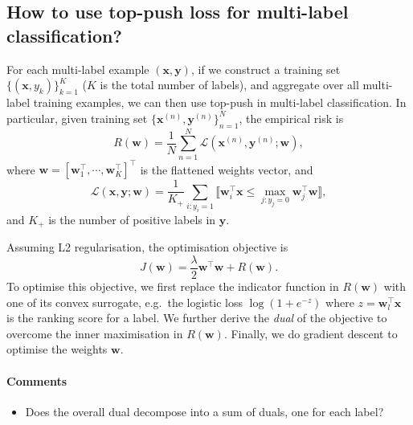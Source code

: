 \documentclass[9pt]{extarticle}
\newcommand{\eat}[1]{}
\newcommand{\llb}{\llbracket}
\newcommand{\rrb}{\rrbracket}
\newcommand{\x}{\mathbf{x}}
\newcommand{\y}{\mathbf{y}}
\newcommand{\1}{\mathbf{1}}
\newcommand{\w}{\mathbf{w}}
\newcommand{\LCal}{\mathcal{L}}
\newcommand{\pb}[1]{^{({#1})}}
\newcommand{\eg}{e.g.\ }
\begin{document}
\subsection*{How to use top-push loss for multi-label classification?}

For each multi-label example $(\x, \y)$, if we construct a training set $\{(\x, y_k)\}_{k=1}^K$ ($K$ is the total number of labels),
and aggregate over all multi-label training examples, we can then use top-push in multi-label classification. 
In particular, given training set $\{\x\pb{n}, \y\pb{n}\}_{n=1}^N$, the empirical risk is
\begin{equation*}
R(\w) = \frac{1}{N} \sum_{n=1}^N \LCal(\x\pb{n}, \y\pb{n}; \w),
\end{equation*}
where $\w = [\w_1^\top, \cdots, \w_K^\top]^\top$ is the flattened weights vector, and
\begin{equation}
\label{eq:top-push_loss}
\LCal(\x, \y; \w) = \frac{1}{K_+} \sum_{i:y_i=1} \llb \w_i^\top \x \le \underset{j:y_j=0}{\max} \w_j^\top \w \rrb,
\end{equation}
and $K_+$ is the number of positive labels in $\y$.

\eat{
\begin{equation*}
R(\w) = \frac{1}{N} \sum_{n=1}^N \frac{1}{K_+^n} \sum_{i:y_i^n=1} \llb \w_i^\top \x \le \underset{j:y_j^n=0}{\max} \w_j^\top \x \rrb,
\end{equation*}
where $K_+^n$ is the number of positive labels in $\y\pb{n}$.
}

Assuming L2 regularisation, the optimisation objective is
\begin{equation*}
J(\w) = \frac{\lambda}{2}\w^\top \w + R(\w).
\end{equation*}
To optimise this objective, we first replace the indicator function in $R(\w)$ with one of its convex surrogate, 
\eg the logistic loss $\log(1+e^{-z})$ where $z = \w_l^\top \x$ is the ranking score for a label.
We further derive the \emph{dual} of the objective to overcome the inner maximisation in $R(\w)$.
Finally, we do gradient descent to optimise the weights $\w$.

\paragraph{Comments}
{\it
\begin{itemize}
\item Does the overall dual decompose into a sum of duals, one for each label?
\end{itemize}
}
\end{document}
